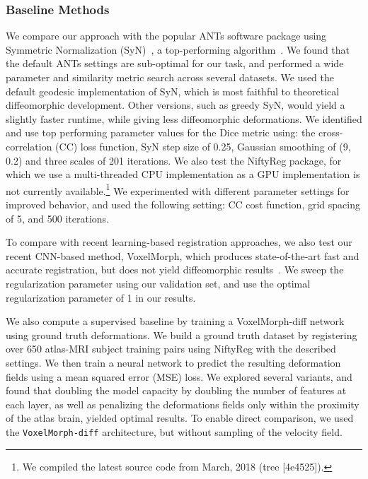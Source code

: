 \documentclass{article}
\newcommand{\citep}{\cite}
\begin{document}
\subsubsection{Baseline Methods} We compare our approach with the popular ANTs software package using Symmetric Normalization (SyN)~\citep{avants2008}, a top-performing algorithm~\citep{klein2009}.  {\color{blue}We
	found that the default ANTs settings are sub-optimal for our task,
	and performed a wide parameter and similarity metric search
	across several datasets. We used the default geodesic implementation of SyN, which is most faithful to theoretical diffeomorphic development. Other versions, such as greedy SyN, would yield a slightly faster runtime, while giving less diffeomorphic deformations. We identified and use top performing
	parameter values for the Dice metric using: the cross-correlation
	(CC) loss function, SyN step size of 0.25, Gaussian smoothing
	of (9, 0.2) and three scales of 201 iterations.} We also test the NiftyReg package, for which we use a multi-threaded CPU implementation as a GPU implementation is not currently available.\footnote{We compiled the latest source code from March, 2018 (tree [4e4525]).} We experimented with different parameter settings for improved behavior, and used the following setting: CC cost function, grid spacing of 5, and 500 iterations.

To compare with recent learning-based registration approaches, we also test our recent CNN-based method, VoxelMorph, which produces state-of-the-art fast and accurate registration, but does not yield diffeomorphic results~\citep{balakrishnan2018a, balakrishnan2019}. We sweep the regularization parameter using our validation set, and use the optimal regularization parameter of 1 in our results.

{\color{blue} We also compute a supervised baseline by training a VoxelMorph-diff network using ground truth deformations. We build a ground truth dataset by registering over 650 atlas-MRI subject training pairs using NiftyReg with the described settings. We then train a neural network to predict the resulting deformation fields using a mean squared error (MSE) loss. We explored several variants, and found that doubling the model capacity by doubling the number of features at each layer, as well as penalizing the deformations fields only within the proximity of the atlas brain, yielded optimal results. To enable direct comparison, we used the \verb|VoxelMorph-diff| architecture, but without sampling of the velocity field.}
\end{document}
